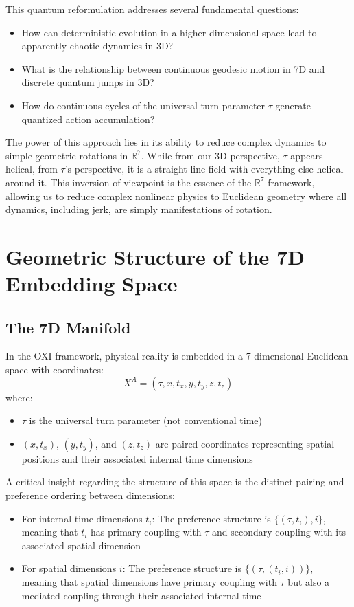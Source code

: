 \documentclass{article}
\begin{document}
This quantum reformulation addresses several fundamental questions:
\begin{itemize}
\item How can deterministic evolution in a higher-dimensional space lead to apparently chaotic dynamics in 3D?
\item What is the relationship between continuous geodesic motion in 7D and discrete quantum jumps in 3D?
\item How do continuous cycles of the universal turn parameter $\tau$ generate quantized action accumulation?
\end{itemize}

The power of this approach lies in its ability to reduce complex dynamics to simple geometric rotations in $\mathbb{R}^7$. While from our 3D perspective, $\tau$ appears helical, from $\tau$'s perspective, it is a straight-line field with everything else helical around it. This inversion of viewpoint is the essence of the $\mathbb{R}^7$ framework, allowing us to reduce complex nonlinear physics to Euclidean geometry where all dynamics, including jerk, are simply manifestations of rotation.

\section{Geometric Structure of the 7D Embedding Space}

\subsection{The 7D Manifold}

In the OXI framework, physical reality is embedded in a 7-dimensional Euclidean space with coordinates:
\begin{equation}
X^A = (\tau, x, t_x, y, t_y, z, t_z)
\end{equation}
where:
\begin{itemize}
\item $\tau$ is the universal turn parameter (not conventional time)
\item $(x, t_x)$, $(y, t_y)$, and $(z, t_z)$ are paired coordinates representing spatial positions and their associated internal time dimensions
\end{itemize}

A critical insight regarding the structure of this space is the distinct pairing and preference ordering between dimensions:

\begin{itemize}
\item For internal time dimensions $t_i$: The preference structure is $\{(\tau, t_i), i\}$, meaning that $t_i$ has primary coupling with $\tau$ and secondary coupling with its associated spatial dimension
\item For spatial dimensions $i$: The preference structure is $\{(\tau, (t_i, i))\}$, meaning that spatial dimensions have primary coupling with $\tau$ but also a mediated coupling through their associated internal time
\end{itemize}
\end{document}
